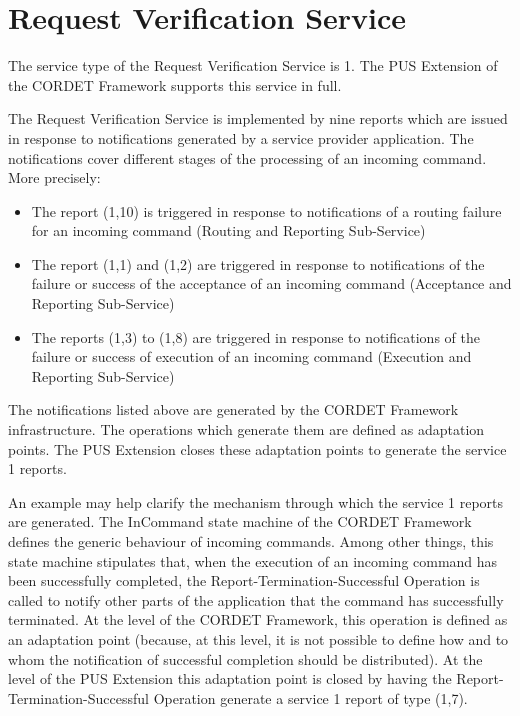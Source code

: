 \documentclass{pnp_article}
\begin{document}
\newpage
{}









\section{Request Verification Service}\label{sec:serv1}
The service type of the Request Verification Service is 1. The PUS Extension of the CORDET Framework supports this service in full.

The Request Verification Service is implemented by nine reports which are issued  in response to notifications generated by a service provider application. The notifications cover different stages of the processing of an incoming command. More precisely:

\begin{itemize}
\item The report (1,10) is triggered in response to notifications of a routing failure for an incoming command (Routing and Reporting Sub-Service)
\item The report (1,1) and (1,2) are triggered in response to notifications of the failure or success of the acceptance of an incoming command (Acceptance and Reporting Sub-Service) 
\item The reports (1,3) to (1,8) are triggered in response to notifications of the failure or success of execution of an incoming command (Execution and Reporting Sub-Service)
\end{itemize}

The notifications listed above are generated by the CORDET Framework infrastructure. The operations which generate them are defined as adaptation points. The PUS Extension closes these adaptation points to generate the service 1 reports. 

An example may help clarify the mechanism through which the service 1 reports are generated. The InCommand state machine of the CORDET Framework defines the generic behaviour of incoming commands. Among other things, this state machine stipulates that, when the execution of an incoming command has been successfully completed, the Report-Termination-Successful Operation is called to notify other parts of the application that the command has successfully terminated. At the level of the CORDET Framework, this operation is defined as an adaptation point (because, at this level, it is not possible to define how and to whom the notification of successful completion should be distributed). At the level of the PUS Extension this adaptation point is closed by having the Report-Termination-Successful Operation generate a service 1 report of type (1,7).
\end{document}
